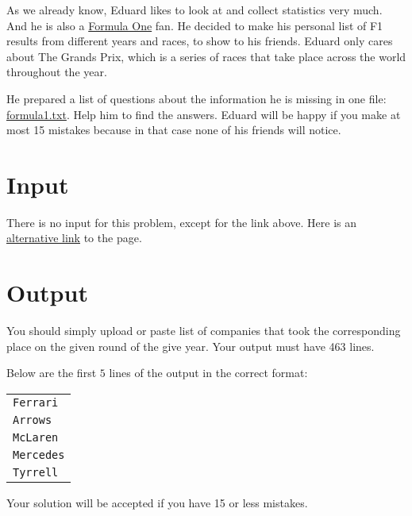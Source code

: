 As we already know, Eduard likes to look at and collect statistics very much.
And he is also a \href{https://en.wikipedia.org/wiki/Formula_One}{Formula One} fan.
He decided to make his personal list of F1 results from different years and races, to show to his friends.
Eduard only cares about The Grands Prix, which is a series of races that take place across the world throughout the year.

He prepared a list of questions about the information he is missing in one file:
\href{http://ejudge.rau.am/ejudge/formula1.txt}{formula1.txt}.
Help him to find the answers.
Eduard will be happy if you make at most 15 mistakes because in that case none of his friends will notice.

\section*{Input}
There is no input for this problem, except for the link above.
Here is an \href{http://167.71.248.201/ejudge/formula1.txt}{alternative link} to the page.

\section*{Output}
You should simply upload or paste list of companies that took the corresponding place on the given round of the give year.
Your output must have 463 lines.

Below are the first $5$ lines of the output in the correct format:
\begin{center}
    \begin{tabular}{l}
        \texttt{Ferrari} \\
        \texttt{Arrows} \\
        \texttt{McLaren} \\
        \texttt{Mercedes} \\
        \texttt{Tyrrell}
    \end{tabular}
\end{center}
Your solution will be accepted if you have 15 or less mistakes.
